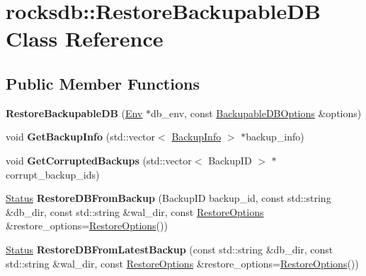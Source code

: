 \hypertarget{classrocksdb_1_1RestoreBackupableDB}{}\section{rocksdb\+:\+:Restore\+Backupable\+DB Class Reference}
\label{classrocksdb_1_1RestoreBackupableDB}
\subsection*{Public Member Functions}
\begin{DoxyCompactItemize}
\item 
{\bfseries Restore\+Backupable\+DB} (\hyperlink{classrocksdb_1_1Env}{Env} $\ast$db\+\_\+env, const \hyperlink{structrocksdb_1_1BackupableDBOptions}{Backupable\+D\+B\+Options} \&options)\hypertarget{classrocksdb_1_1RestoreBackupableDB_a99288ae06ea295685e8adf70d3d2cdb6}{}\label{classrocksdb_1_1RestoreBackupableDB_a99288ae06ea295685e8adf70d3d2cdb6}

\item 
void {\bfseries Get\+Backup\+Info} (std\+::vector$<$ \hyperlink{structrocksdb_1_1BackupInfo}{Backup\+Info} $>$ $\ast$backup\+\_\+info)\hypertarget{classrocksdb_1_1RestoreBackupableDB_a17d272e67c518523c5d61301b78daa99}{}\label{classrocksdb_1_1RestoreBackupableDB_a17d272e67c518523c5d61301b78daa99}

\item 
void {\bfseries Get\+Corrupted\+Backups} (std\+::vector$<$ Backup\+ID $>$ $\ast$corrupt\+\_\+backup\+\_\+ids)\hypertarget{classrocksdb_1_1RestoreBackupableDB_acbc4fd7ca4193eb8b9ef2637d484805c}{}\label{classrocksdb_1_1RestoreBackupableDB_acbc4fd7ca4193eb8b9ef2637d484805c}

\item 
\hyperlink{classrocksdb_1_1Status}{Status} {\bfseries Restore\+D\+B\+From\+Backup} (Backup\+ID backup\+\_\+id, const std\+::string \&db\+\_\+dir, const std\+::string \&wal\+\_\+dir, const \hyperlink{structrocksdb_1_1RestoreOptions}{Restore\+Options} \&restore\+\_\+options=\hyperlink{structrocksdb_1_1RestoreOptions}{Restore\+Options}())\hypertarget{classrocksdb_1_1RestoreBackupableDB_aac7e79522516f2685877eb0b2a034490}{}\label{classrocksdb_1_1RestoreBackupableDB_aac7e79522516f2685877eb0b2a034490}

\item 
\hyperlink{classrocksdb_1_1Status}{Status} {\bfseries Restore\+D\+B\+From\+Latest\+Backup} (const std\+::string \&db\+\_\+dir, const std\+::string \&wal\+\_\+dir, const \hyperlink{structrocksdb_1_1RestoreOptions}{Restore\+Options} \&restore\+\_\+options=\hyperlink{structrocksdb_1_1RestoreOptions}{Restore\+Options}())\hypertarget{classrocksdb_1_1RestoreBackupableDB_abe5e355e3185131a77cc358d99fe4558}{}\label{classrocksdb_1_1RestoreBackupableDB_abe5e355e3185131a77cc358d99fe4558}


\end{DoxyCompactItemize}
